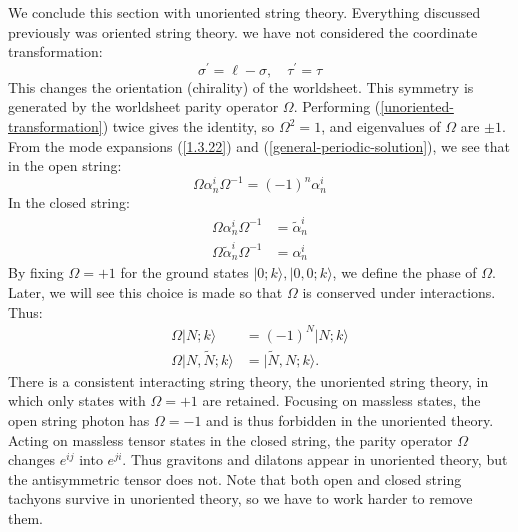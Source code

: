We conclude this section with unoriented string theory. Everything discussed previously was oriented string theory. we have not considered the coordinate transformation: 
\begin{equation}
	\sigma^{\prime}=\ell-\sigma, \quad \tau^{\prime}=\tau \label{unoriented-transformation}
\end{equation}
This changes the orientation (chirality) of the worldsheet. This symmetry is generated by the worldsheet parity operator $\Omega$. Performing (\ref{unoriented-transformation}) twice gives the identity, so $\Omega^2=1$, and eigenvalues of $\Omega$ are $\pm 1$. 
From the mode expansions (\ref{1.3.22}) and (\ref{general-periodic-solution}), we see that in the open string: 
\begin{equation}
	\Omega \alpha_{n}^{i} \Omega^{-1}=(-1)^{n} \alpha_{n}^{i}
\end{equation}
In the closed string: 
\begin{subequations}
	\begin{align}
		\Omega \alpha_{n}^{i} \Omega^{-1}&=\tilde{\alpha}_{n}^{i}\\
		\Omega \tilde{\alpha}_{n}^{i} \Omega^{-1}&=\alpha_{n}^{i}
	\end{align}
\end{subequations}
By fixing $\Omega=+1$ for the ground states $|0;k\rangle, |0,0;k\rangle$, we define the phase of $\Omega$. Later, we will see this choice is made so that $\Omega$ is conserved under interactions. Thus: 
\begin{subequations}
	\begin{align}
		\Omega|N ; k\rangle&=(-1)^{N}|N ;  k\rangle \\
		\Omega|N, \tilde{N} ; k\rangle&=|\tilde{N}, N ; k\rangle.
	\end{align}
\end{subequations}
There is a consistent interacting string theory, the unoriented string theory, in which only states with $\Omega=+1$ are retained. Focusing on massless states, the open string photon has $\Omega=-1$ and is thus forbidden in the unoriented theory. Acting on massless tensor states in the closed string, the parity operator $\Omega$ changes $e^{ij}$ into $e^{ji}$. Thus gravitons and dilatons appear in unoriented theory, but the antisymmetric tensor does not. 
Note that both open and closed string tachyons survive in unoriented theory, so we have to work harder to remove them. 

